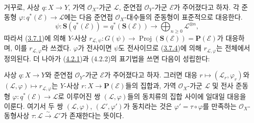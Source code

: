 \begin{env}[4.2.2]
\label{II.4.2.2-ko}
거꾸로, 사상 $q:X\to Y$, 가역 $\mathcal{O}_X$-가군 $\mathcal{L}$,
준연접 $\mathcal{O}_Y$-가군 $\mathcal{E}$가 주어졌다고 하자. 각 준동형
$\varphi:q^*(\mathcal{E})\to\mathcal{L}$에는 다음 준연접
$\mathcal{O}_X$-대수들의 준동형이 표준적으로 대응한다.
\[
  \psi:\mathbf{S}(q^*(\mathcal{E}))=q^*(\mathbf{S}(\mathcal{E}))
  \longrightarrow\bigoplus_{n\geq0}\mathcal{L}^{\otimes n},
\]
따라서 (\hyperref[II.3.7.1-ko]{3.7.1})에 의해 $Y$-사상
$r_{\mathcal{L},\psi}:G(\psi)\to
\operatorname{Proj}(\mathbf{S}(\mathcal{E}))=\mathbf{P}(\mathcal{E})$가
대응하며, 이를 $r_{\mathcal{L},\varphi}$라 쓰겠다. $\varphi$가 전사이면
$\psi$도 전사이므로 (\hyperref[II.3.7.4-ko]{3.7.4})에 의해
$r_{\mathcal{L},\varphi}$는 전체에서 정의된다. 더 나아가
(\hyperref[II.4.2.1-ko]{4.2.1})과 (4.2.2)의 표기법을 쓰면 다음이
성립한다:
\end{env}

\begin{proposition}[4.2.3]
\label{II.4.2.3-ko}
사상 $q:X\to Y$와 준연접 $\mathcal{O}_Y$-가군
$\mathcal{E}$가 주어졌다고 하자. 그러면 대응
$r\mapsto(\mathcal{L}_r,\varphi_r)$와
$(\mathcal{L},\varphi)\mapsto r_{\mathcal{L},\varphi}$는
$Y$-사상 $r:X\to\mathbf{P}(\mathcal{E})$들의 집합과, 가역
$\mathcal{O}_X$-가군 $\mathcal{L}$ 및 전사 준동형
$\varphi:q^*(\mathcal{E})\to\mathcal{L}$로 이루어진 쌍
$(\mathcal{L},\varphi)$들의 동치류의 집합 사이에 일대일 대응을 이룬다.
여기서 두 쌍 $(\mathcal{L},\varphi)$,
$(\mathcal{L}',\varphi')$가 동치라는 것은
$\varphi'=\tau\circ\varphi$를 만족하는 $\mathcal{O}_X$-동형사상
$\tau:\mathcal{L}\xrightarrow{\sim}\mathcal{L}'$가 존재한다는 뜻이다.
\end{proposition}

